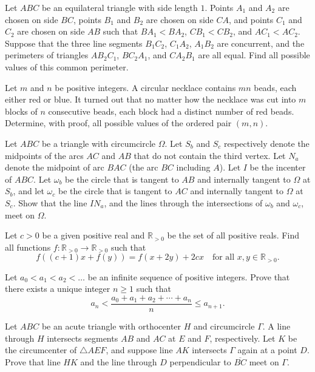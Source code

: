 \documentclass[11pt]{scrartcl}
\begin{document}
\begin{problem}[803002459788170506]
	Let $ABC$ be an equilateral triangle with side length $1$. Points $A_1$ and $A_2$ are chosen on side $BC$, points $B_1$ and $B_2$ are chosen on side $CA$, and points $C_1$ and $C_2$ are chosen on side $AB$ such that $BA_1<BA_2$, $CB_1<CB_2$, and $AC_1<AC_2$.
Suppose that the three line segments $B_1C_2$, $C_1A_2$, $A_1B_2$ are concurrent, and the perimeters of triangles $AB_2C_1$, $BC_2A_1$, and $CA_2B_1$ are all equal. Find all possible values of this common perimeter.
\end{problem}
\begin{problem}[811235233671414145]
Let $m$ and $n$ be positive integers. A circular necklace contains $mn$ beads, each either red or blue. It turned out that no matter how the necklace was cut into $m$ blocks of $n$ consecutive beads, each block had a distinct number of red beads. Determine, with proof, all possible values of the ordered pair $(m, n)$.
\end{problem}
\begin{problem}[844358232542368378]
Let $ABC$ be a triangle with circumcircle $\Omega$. Let $S_b$ and $S_c$ respectively denote the midpoints of the arcs $AC$ and $AB$ that do not contain the third vertex. Let $N_a$ denote the midpoint of arc $BAC$ (the arc $BC$ including $A$). Let $I$ be the incenter of $ABC$. Let $\omega_b$ be the circle that is tangent to $AB$ and internally tangent to $\Omega$ at $S_b$, and let $\omega_c$ be the circle that is tangent to $AC$ and internally tangent to $\Omega$ at $S_c$. Show that the line $IN_a$, and the lines through the intersections of $\omega_b$ and $\omega_c$, meet on $\Omega$.
\end{problem}
\begin{problem}[878429961754697605]
Let $c>0$ be a given positive real and $\mathbb{R}_{>0}$ be the set of all positive reals. Find all functions $f \colon \mathbb{R}_{>0} \to \mathbb{R}_{>0}$ such that\[f((c+1)x+f(y))=f(x+2y)+2cx \quad \textrm{for all } x,y \in \mathbb{R}_{>0}.\]
\end{problem}
\begin{problem}[890162155331408920]
Let $a_0 < a_1 < a_2 < \dots$ be an infinite sequence of positive integers. Prove that there exists a unique integer $n\geq 1$ such that
\[a_n < \frac{a_0+a_1+a_2+\cdots+a_n}{n} \leq a_{n+1}.\]
\end{problem}
\begin{problem}[896600029778859256]
	Let $ABC$ be an acute triangle with orthocenter $H$ and circumcircle $\Gamma$. A line through $H$ intersects segments $AB$ and $AC$ at $E$ and $F$, respectively. Let $K$ be the circumcenter of $\triangle AEF$, and suppose line $AK$ intersects $\Gamma$ again at a point $D$. Prove that line $HK$ and the line through $D$ perpendicular to $\overline{BC}$ meet on $\Gamma$.
\end{problem}
\end{document}
